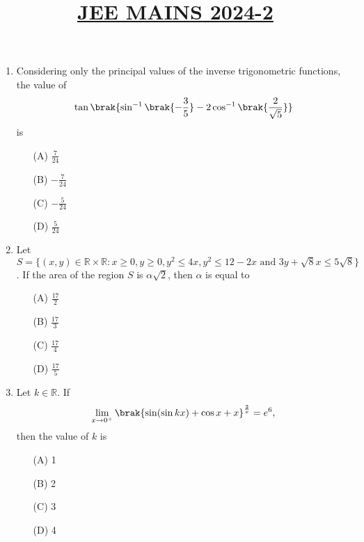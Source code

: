 \documentclass[12pt,a4paper]{article}
\title{\underline{\textbf{JEE MAINS 2024-2}}}
\date{}
\begin{document}
\maketitle
\begin{enumerate}
		\item Considering only the principal values of the inverse trigonometric functions, the value of  
\[
    \tan \brak{ \sin^{-1} \brak{ -\frac{3}{5} } - 2\cos^{-1} \brak{ \frac{2}{\sqrt{5}} } }
\]
    is  
    \begin{itemize}
        \item[(A)] $\frac{7}{24}$
        \item[(B)] $-\frac{7}{24}$
        \item[(C)] $-\frac{5}{24}$
        \item[(D)] $\frac{5}{24}$
    \end{itemize}

    \item Let $ S = \{(x,y) \in \mathbb{R} \times \mathbb{R} : x \geq 0, y \geq 0, y^2 \leq 4x, y^2 \leq 12 - 2x \text{ and } 3y + \sqrt{8}x \leq 5\sqrt{8} \} $.  
    If the area of the region $ S $ is $ \alpha \sqrt{2} $, then $ \alpha $ is equal to  
    \begin{itemize}
        \item[(A)] $\frac{17}{2}$
        \item[(B)] $\frac{17}{3}$
        \item[(C)] $\frac{17}{4}$
        \item[(D)] $\frac{17}{5}$
    \end{itemize}

    \item Let $ k \in \mathbb{R} $. If  
\[
    \lim_{x \to 0^+} \brak{ \sin(\sin kx) + \cos x + x }^{\frac{2}{x}} = e^6,
\]
    then the value of $ k $ is  
    \begin{itemize}
        \item[(A)] 1
        \item[(B)] 2
        \item[(C)] 3
        \item[(D)] 4
    \end{itemize}


\end{enumerate}
\end{document}
